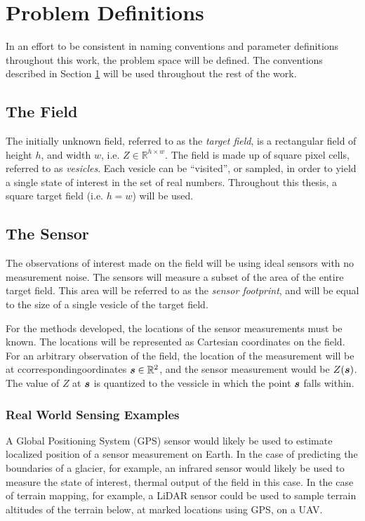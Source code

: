 \section{Problem Definitions} \label{ch:defs}
In an effort to be consistent in naming conventions and parameter definitions throughout this work, the problem space will be defined. The conventions described in Section \ref{ch:defs} will be used throughout the rest of the work.

\subsection{The Field}
The initially unknown field, referred to as the \textit{target field}, is a rectangular field of height $h$, and width $w$, i.e. $Z \in \mathbb{R}^{h \times w}$. The field is made up of square pixel cells, referred to as \textit{vesicles}. Each vesicle can be ``visited'', or sampled, in order to yield a single state of interest in the set of real numbers. Throughout this thesis, a square target field (i.e. $h = w$) will be used.

\subsection{The Sensor} \label{sec:sensor_measurements}
The observations of interest made on the field will be using ideal sensors with no measurement noise. The sensors will measure a subset of the area of the entire target field. This area will be referred to as the \textit{sensor footprint}, and will be equal to the size of a single vesicle of the target field.

For the methods developed, the locations of the sensor measurements must be known. The locations will be represented as Cartesian coordinates on the field. For an arbitrary observation of the field, the location of the measurement will be at ccorrespondingoordinates ${\it{\boldsymbol{s}}} \in \mathbb{R}^2$, and the  sensor measurement would be $Z({\it{\boldsymbol{s}}})$. The value of $Z$ at ${\it{\boldsymbol{s}}}$ is quantized to the vessicle in which the point ${\it{\boldsymbol{s}}}$ falls within.

\subsubsection{Real World Sensing Examples}
A Global Positioning System (GPS) sensor would likely be used to estimate localized position of a sensor measurement on Earth. In the case of predicting the boundaries of a glacier, for example, an infrared sensor would likely be used to measure the state of interest, thermal output of the field in this case. In the case of terrain mapping, for example, a LiDAR sensor could be used to sample terrain altitudes of the terrain below, at marked locations using GPS, on a UAV.
